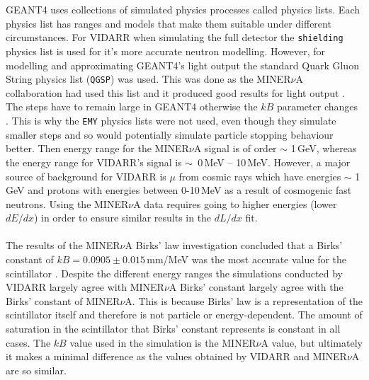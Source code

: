 \\\\GEANT4 uses collections of simulated physics processes called physics lists. Each physics list has ranges and models that make them suitable under different circumstances. For VIDARR when simulating the full detector the \texttt{shielding} physics list is used for it's more accurate neutron modelling. However, for modelling and approximating GEANT4's light output the standard Quark Gluon String physics list (\texttt{QGSP}) was used. This was done as the MINER$\nu$A collaboration had used this list and it produced good results for light output \cite{Patrick_2018}. The steps have to remain large in GEANT4 otherwise the $kB$ parameter changes \cite{aliaga_2015}. This is why the \texttt{EMY} physics lists were not used, even though they simulate smaller steps and so would potentially simulate particle stopping behaviour better. Then energy range for the MINER$\nu$A signal is of order $\sim$ 1\,GeV, whereas the energy range for VIDARR's signal is $\sim$~0\,MeV -- 10\,MeV. However, a major source of background for VIDARR is $\mu$ from cosmic rays which have energies $\sim$ 1\,GeV and protons with energies between 0-10\,MeV as a result of cosmogenic fast neutrons. Using the MINER$\nu$A data requires going to higher energies (lower $dE/dx$) in order to ensure similar results in the $dL/dx$ fit.  
\\\\The results of the MINER$\nu$A Birks' law investigation concluded that a Birks' constant of $kB = 0.0905 \pm 0.015$\,mm/MeV was the most accurate value for the scintillator \cite{aliaga_2015}. Despite the different energy ranges the simulations conducted by VIDARR largely agree with MINER$\nu$A Birks' constant largely agree with the Birks' constant of MINER$\nu$A. This is because Birks' law is a representation of the scintillator itself and therefore is not particle or energy-dependent. The amount of saturation in the scintillator that Birks' constant represents is constant in all cases. The $kB$ value used in the simulation is the MINER$\nu$A value, but ultimately it makes a minimal difference as the values obtained by VIDARR and MINER$\nu$A are so similar. 
